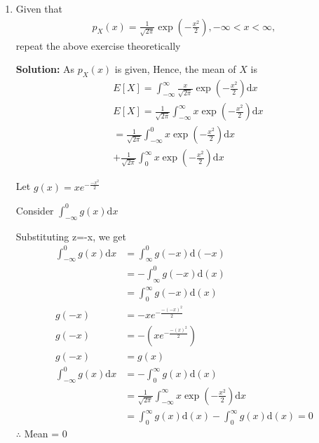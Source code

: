 \documentclass[journal,12pt,twocolumn]{IEEEtran}
\newcommand{\solution}{\noindent \textbf{Solution: }}
\providecommand{\brak}[1]{\ensuremath{\left(#1\right)}}
\providecommand{\mean}[1]{E\left[ #1 \right]}
\numberwithin{equation}{section}
\renewcommand\thesection{\arabic{section}}
\begin{document}
\begin{enumerate}[label=\thesection.\arabic*,ref=\thesection.\theenumi]
\begin{enumerate}[label=\thesection.\arabic*,ref=\thesection.\theenumi]
	\solution Download the following code and execute the C program
	\begin{lstlisting}
wget https://github.com/Pradeep8802/Random_numbers/blob/main/2.4/coeffs.h
wget https://github.com/Pradeep8802/Random_numbers/blob/main/2.4/mean_variance_gaussian.c
	\end{lstlisting}
	Run the code by executing the below command
\begin{lstlisting}
cc mean_variance_gaussian.c -lm
./a.out
\end{lstlisting}
	\begin{align}
            \mu &= 0.000326\\
            \sigma &= 1.000906\\
		\text{Mean} &= 0.000326 \\
		\text{Variance} &= 1.000906 
	\end{align}	
 
	\item Given that
	\begin{align}
		p_{X}(x) = \frac{1}{\sqrt{2\pi}}\exp\brak{-\frac{x^2}{2}}, -\infty < x < \infty,
	\end{align}
	repeat the above exercise theoretically
	
	\solution 
        As $p_{X}(x)$ is given,
        Hence, the mean of $X$ is 
	\begin{align}
		&\mean{X} = \int_{-\infty}^{\infty} \frac{x}{\sqrt{2\pi}}\exp\brak{-\frac{x^2}{2}} \mathrm{d}x \\
  		&\mean{X} = \frac{1}{\sqrt{2\pi}} \int_{-\infty}^{\infty} x \exp\brak{-\frac{x^2}{2}} \mathrm{d}x   \\
&=\frac{1}{\sqrt{2\pi}} \int_{-\infty}^{0} x \exp\brak{-\frac{x^2}{2}} \mathrm{d}x \nonumber \\ 
&+\frac{1}{\sqrt{2\pi}} \int_{0}^{\infty} x \exp\brak{-\frac{x^2}{2}} \mathrm{d}x 
        \end{align}

Let $g(x)=x e^{-\frac{-x^2}{2}} $

Consider $\int_{-\infty}^{0} g(x) \mathrm{d}x$

Substituting z=-x, we get
\begin{align}
\int_{-\infty}^{0} g(x) \mathrm{d}x &= \int_{\infty}^{0} g(-x) \mathrm{d}(-x) \\
&=- \int_{\infty}^{0} g(-x) \mathrm{d}(x) \\
&= \int_{0}^{\infty} g(-x) \mathrm{d}(x) \\
g(-x)&= -x e^{-\frac{-(-x)^2}{2}}  \\
g(-x)&= -(x e^{-\frac{-(x)^2}{2}}) \\
g(-x)&=g(x) \\
\int_{-\infty}^{0} g(x) \mathrm{d}x &= - \int_{0}^{\infty} g(x) \mathrm{d}(x) \\
&= \frac{1}{\sqrt{2\pi}} \int_{-\infty}^{\infty} x \exp\brak{-\frac{x^2}{2}} \mathrm{d}x \\
&=\int_{0}^{\infty} g(x) \mathrm{d}(x)- \int_{0}^{\infty} g(x) \mathrm{d}(x) = 0 
\end{align}
$\therefore$ Mean = 0


\end{enumerate}
\end{enumerate}
\end{document}
